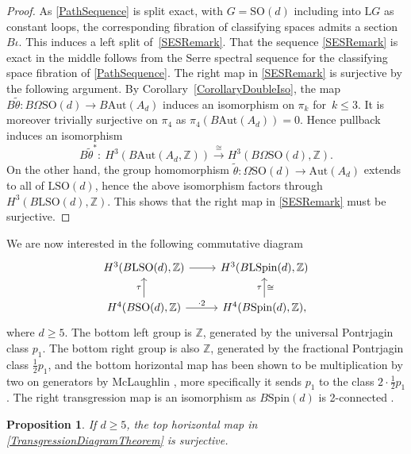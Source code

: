 \documentclass[10pt,a4paper]{amsart}
\numberwithin{equation}{section}
\newtheorem{Proposition}[Theorem]{Proposition}
\newcommand{\Z}{\mathbb{Z}}
\newcommand{\SO}{\mathrm{SO}}
\newcommand{\Aut}{\mathrm{Aut}}
\newcommand{\Spin}{\mathrm{Spin}}
\renewcommand{\L}{\mathrm{L}}
\begin{document}
\begin{proof}
As \eqref{PathSequence} is split exact, with $G = \SO(d)$ including into $\L G$ as constant loops, the corresponding fibration of classifying spaces admits a section $B\iota$.
This induces a left split of~\eqref{SESRemark}.
That the sequence \eqref{SESRemark} is exact in the middle follows from the Serre spectral sequence for the classifying space fibration of \eqref{PathSequence}.
The right map in \eqref{SESRemark} is surjective by the following argument.
By Corollary~\ref{CorollaryDoubleIso}, the map $B\tilde{\theta}\colon B\Omega \SO(d) \to B \Aut(A_d)$ induces an isomorphism on $\pi_k$ for~$k \leq 3$.
It is moreover trivially surjective on $\pi_4$ as $\pi_4(B\Aut(A_d)) = 0$.
Hence pullback induces an isomorphism
\begin{equation*}
 B\tilde{\theta}^* \colon\ H^3(B \Aut(A_d, \Z)) \stackrel{\cong}{\longrightarrow} H^3(B\Omega \SO(d), \Z).
\end{equation*}
On the other hand, the group homomorphism $\tilde{\theta} \colon \Omega \SO(d) \to \Aut(A_d)$ extends to all of $\L \SO(d)$, hence the above isomorphism factors through $H^3(B\L \SO(d), \Z)$.
This shows that the right map in \eqref{SESRemark} must be surjective.
\end{proof}

We are now interested in the following commutative diagram
\begin{equation}\label{TransgressionDiagramTheorem}
\begin{tikzcd}
 H^3(B\L\SO(d), \Z) \ar[r] & H^3(B\L\Spin(d), \Z) \\
 H^4(B\SO(d), \Z) \ar[u, "\tau"] \ar[r, "\cdot 2"] & H^4(B\Spin(d), \Z), \ar[u, "\tau", "\cong"']
\end{tikzcd}
\end{equation}
where $d\geq 5$.
The bottom left group is $\Z$, generated by the universal Pontrjagin class $p_1$.
The bottom right group is also $\Z$, generated by the fractional Pontrjagin class $\frac{1}{2} p_1$, and the bottom horizontal map has been shown to be multiplication by two on generators by McLaughlin \cite[proof of Lemma~2.2]{McLaughlin}, more specifically it sends $p_1$ to the class $2 \cdot \frac{1}{2} p_1$.
The right transgression map is an isomorphism as $B\Spin(d)$ is 2-connected \cite[p.~149]{McLaughlin}.

\begin{Proposition} \label{PropCommDiagramH3Transgression}
If $d \geq 5$, the top horizontal map in \eqref{TransgressionDiagramTheorem} is surjective.
\end{Proposition}
\end{document}
